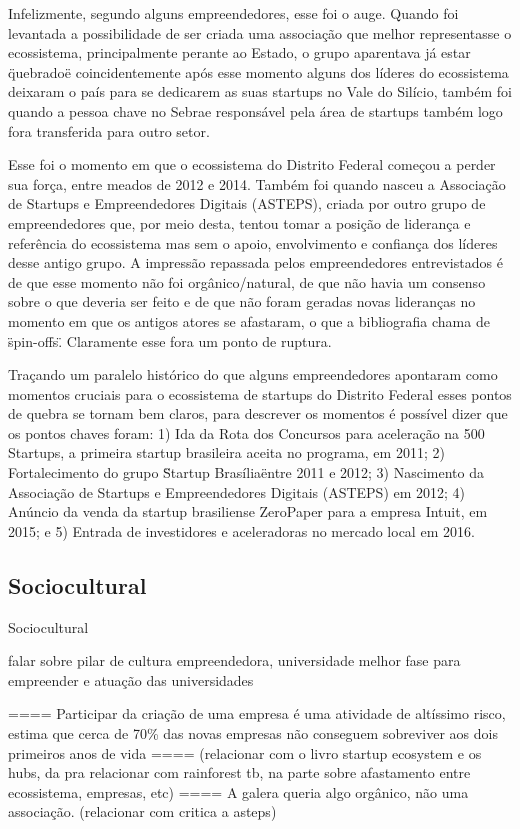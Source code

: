 Infelizmente, segundo alguns empreendedores, esse foi o auge. Quando foi levantada a possibilidade de ser criada uma associação que melhor representasse o ecossistema, principalmente perante ao Estado, o grupo aparentava já estar \"quebrado\" e coincidentemente após esse momento alguns dos líderes do ecossistema deixaram o país para se dedicarem as suas startups no Vale do Silício, também foi quando a pessoa chave no Sebrae responsável pela área de startups também logo fora transferida para outro setor. 

Esse foi o momento em que o ecossistema do Distrito Federal começou a perder sua força, entre meados de 2012 e 2014. Também foi quando nasceu a Associação de Startups e Empreendedores Digitais (ASTEPS), criada por outro grupo de empreendedores que, por meio desta, tentou tomar a posição de liderança e referência do ecossistema mas sem o apoio, envolvimento e confiança dos líderes desse antigo grupo. A impressão repassada pelos empreendedores entrevistados é de que esse momento não foi orgânico/natural, de que não havia um consenso sobre o que deveria ser feito e de que não foram geradas novas lideranças no momento em que os antigos atores se afastaram, o que a bibliografia chama de \"spin-offs\". Claramente esse fora um ponto de ruptura.

Traçando um paralelo histórico do que alguns empreendedores apontaram como momentos cruciais para o ecossistema de startups do Distrito Federal esses pontos de quebra se tornam bem claros, para descrever os momentos é possível dizer que os pontos chaves foram: 1) Ida da Rota dos Concursos para aceleração na 500 Startups, a primeira startup brasileira aceita no programa, em 2011; 2) Fortalecimento do grupo \"Startup Brasília\" entre 2011 e 2012; 3) Nascimento da Associação de Startups e Empreendedores Digitais (ASTEPS) em 2012; 4) Anúncio da venda da startup brasiliense ZeroPaper para a empresa Intuit, em 2015; e 5) Entrada de investidores e aceleradoras no mercado local em 2016. 

\subsection{Sociocultural}
\label{subsection:pergunta_de_pesquisa_2}

Sociocultural

falar sobre pilar de cultura empreendedora, universidade melhor fase para empreender e atuação das universidades

==== Participar da criação de uma empresa é uma atividade de altíssimo risco,  estima que cerca de 70\% das novas empresas não conseguem sobreviver aos dois primeiros anos de vida
==== (relacionar com o livro startup ecosystem e os hubs, da pra relacionar com rainforest tb, na parte sobre afastamento entre ecossistema, empresas, etc)
==== A galera queria algo orgânico, não uma associação. (relacionar com critica a asteps)

